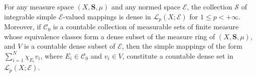 For any measure space $(X, \mathbf{S}, \mu)$ and any normed space $\mathcal{E}$, the collection $\mathcal{S}$ of integrable simple $\mathcal{E}$-valued mappings is dense in $\mathcal{L}_p(X; \mathcal{E})$ for $1 \leq p < +\infty$. Moreover, if $\mathcal{C}_0$ is a countable collection of measurable sets of finite measure whose equivalence classes form a dense subset of the measure ring of $(X, \mathbf{S}, \mu)$, and $V$ is a countable dense subset of $\mathcal{E}$, then the simple mappings of the form $\sum_{i=1}^N \chi_{E_i} v_i$, where $E_i \in \mathcal{C}_0$ and $v_i \in V$, constitute a countable dense set in $\mathcal{L}_p(X; \mathcal{E})$.
